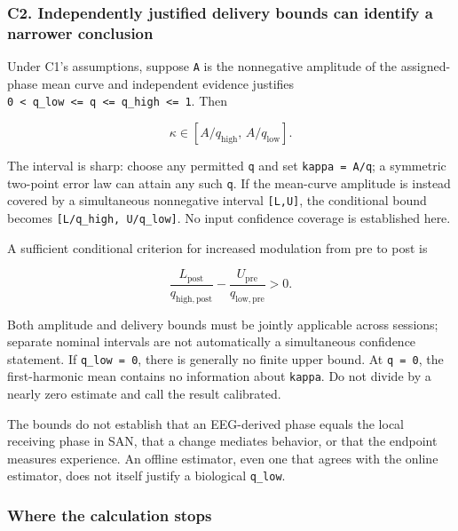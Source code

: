 \documentclass[
  american,
  11pt,
  letterpaper,
]{article}
\begin{document}
\subsubsection{C2. Independently justified delivery bounds can identify a narrower conclusion}\label{c2.-independently-justified-delivery-bounds-can-identify-a-narrower-conclusion}

Under C1's assumptions, suppose \texttt{A} is the nonnegative amplitude of the assigned-phase mean curve and independent evidence justifies \texttt{0\ \textless{}\ q\_low\ \textless{}=\ q\ \textless{}=\ q\_high\ \textless{}=\ 1}. Then

\begin{equation}\kappa\in[A/q_{\mathrm{high}},\,A/q_{\mathrm{low}}].\tag{G3}\end{equation}

The interval is sharp: choose any permitted \texttt{q} and set \texttt{kappa\ =\ A/q}; a symmetric two-point error law can attain any such \texttt{q}. If the mean-curve amplitude is instead covered by a simultaneous nonnegative interval \texttt{{[}L,U{]}}, the conditional bound becomes \texttt{{[}L/q\_high,\ U/q\_low{]}}. No input confidence coverage is established here.

A sufficient conditional criterion for increased modulation from pre to post is

\begin{equation}\frac{L_{\mathrm{post}}}{q_{\mathrm{high,post}}}-\frac{U_{\mathrm{pre}}}{q_{\mathrm{low,pre}}}>0.\tag{G4}\end{equation}

Both amplitude and delivery bounds must be jointly applicable across sessions; separate nominal intervals are not automatically a simultaneous confidence statement. If \texttt{q\_low\ =\ 0}, there is generally no finite upper bound. At \texttt{q\ =\ 0}, the first-harmonic mean contains no information about \texttt{kappa}. Do not divide by a nearly zero estimate and call the result calibrated.

The bounds do not establish that an EEG-derived phase equals the local receiving phase in SAN, that a change mediates behavior, or that the endpoint measures experience. An offline estimator, even one that agrees with the online estimator, does not itself justify a biological \texttt{q\_low}.

\subsubsection{Where the calculation stops}\label{where-the-calculation-stops}
\end{document}
